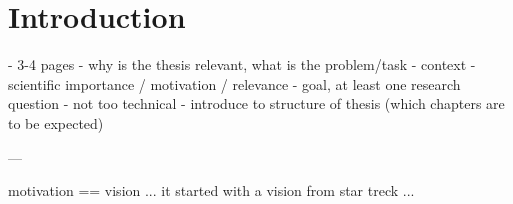 

\chapter{Introduction}

- 3-4 pages
- why is the thesis relevant, what is the problem/task
  - context
  - scientific importance / motivation / relevance
  - goal, at least one research question
- not too technical
- introduce to structure of thesis (which chapters are to be expected)

---

motivation == vision
... it started with a vision from star treck ...


